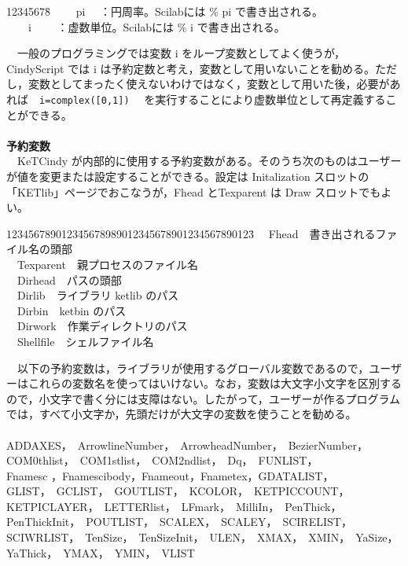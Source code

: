 \documentclass[papersize,a4paper,12pt,uplatex]{jsarticle}
\begin{document}
\begin{tabbing}
12345678\=\kill
　　pi　  \>：円周率。Scilabには \% pi で書き出される。\\
　　i　　\> ：虚数単位。Scilabには \% i で書き出される。\\
\end{tabbing}
　一般のプログラミングでは変数 i をループ変数としてよく使うが，CindyScript では i は予約定数と考え，変数として用いないことを勧める。ただし，変数としてまったく使えないわけではなく，変数として用いた後，必要があれば　\verb|i=complex([0,1])|　 を実行することにより虚数単位として再定義することができる。\\
　\\
{\bf 予約変数}\\
　KeTCindy が内部的に使用する予約変数がある。そのうち次のものはユーザーが値を変更または設定することができる。設定は Initalization スロットの「KETlib」ページでおこなうが，Fhead とTexparent は Draw スロットでもよい。\\
\begin{tabbing}
1234567890123\=45678989012345678901234567890123\=\kill
　Fhead　\>書き出されるファイル名の頭部\\
　Texparent　\>親プロセスのファイル名\\
　Dirhead　\>パスの頭部\\
　Dirlib　\>ライブラリ ketlib のパス\\
　Dirbin　\>ketbin のパス\\
　Dirwork　\>作業ディレクトリのパス\\
　Shellfile　\>シェルファイル名\\
\end{tabbing}
　以下の予約変数は，ライブラリが使用するグローバル変数であるので，ユーザーはこれらの変数名を使ってはいけない。なお，変数は大文字小文字を区別するので，小文字で書く分には支障はない。したがって，ユーザーが作るプログラムでは，すべて小文字か，先頭だけが大文字の変数を使うことを勧める。\\
　\\
ADDAXES，　ArrowlineNumber，　ArrowheadNumber，　BezierNumber，\\
COM0thlist，　COM1stlist，　COM2ndlist，　Dq，　FUNLIST，\\
Fnamesc ，Fnamescibody，Fnameout，Fnametex，GDATALIST，\\
GLIST，　GCLIST，　GOUTLIST，　KCOLOR，　KETPICCOUNT，　\\
KETPICLAYER，　LETTERlist，　LFmark，　MilliIn，　PenThick，　\\
PenThickInit，　POUTLIST，　SCALEX，　SCALEY，　SCIRELIST，　\\
SCIWRLIST，　TenSize，　TenSizeInit，　ULEN，　XMAX，　XMIN，　YaSize，\\
YaThick，　YMAX，　YMIN，　VLIST
\end{document}
